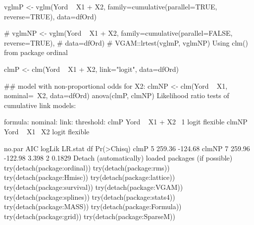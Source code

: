 vglmP  <- vglm(Yord ~ X1 + X2, family=cumulative(parallel=TRUE,  reverse=TRUE),
              data=dfOrd)

# vglmNP <- vglm(Yord ~ X1 + X2, family=cumulative(parallel=FALSE, reverse=TRUE),
#                data=dfOrd)
# VGAM::lrtest(vglmP, vglmNP)
Using clm() from package ordinal

clmP  <- clm(Yord ~ X1 + X2, link="logit", data=dfOrd)

## model with non-proportional odds for X2:
clmNP <- clm(Yord ~ X1, nominal=~X2, data=dfOrd)
anova(clmP, clmNP)
Likelihood ratio tests of cumulative link models:
 
      formula:       nominal: link: threshold:
clmP  Yord ~ X1 + X2 ~1       logit flexible  
clmNP Yord ~ X1      ~X2      logit flexible  

      no.par    AIC  logLik LR.stat df Pr(>Chisq)
clmP       5 259.36 -124.68                      
clmNP      7 259.96 -122.98   3.398  2     0.1829
Detach (automatically) loaded packages (if possible)
try(detach(package:ordinal))
try(detach(package:rms))
try(detach(package:Hmisc))
try(detach(package:lattice))
try(detach(package:survival))
try(detach(package:VGAM))
try(detach(package:splines))
try(detach(package:stats4))
try(detach(package:MASS))
try(detach(package:Formula))
try(detach(package:grid))
try(detach(package:SparseM))
